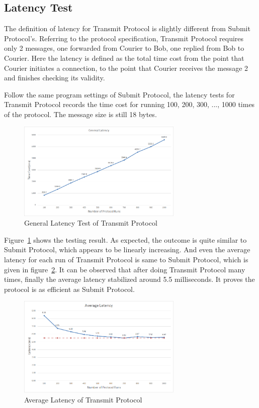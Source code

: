 \subsection{Latency Test}
The definition of latency for Transmit Protocol is slightly different from Submit Protocol's. Referring to the protocol specification, Transmit Protocol requires only 2 messages, one forwarded from Courier to Bob, one replied from Bob to Courier. Here the latency is defined as the total time cost from the point that Courier initiates a connection, to the point that Courier receives the message 2 and finishes checking its validity.

Follow the same program settings of Submit Protocol, the latency tests for Transmit Protocol records the time cost for running 100, 200, 300, ..., 1000 times of the protocol. The message size is still 18 bytes.

\begin{figure}[h!]
\centering
\includegraphics[width=0.7\textwidth,natwidth=882,natheight=529]{figures/latencytransmit.png}
\caption{General Latency Test of Transmit Protocol}
\label{fig:latencytransmit}
\end{figure}

Figure~\ref{fig:latencytransmit} shows the testing result. As expected, the outcome is quite similar to Submit Protocol, which appears to be linearly increasing. And even the average latency for each run of Transmit Protocol is same to Submit Protocol, which is given in figure~\ref{fig:averagelatencytransmit}. It can be observed that after doing Transmit Protocol many times, finally the average latency stabilized around 5.5 milliseconds. It proves the protocol is as efficient as Submit Protocol.

\begin{figure}[h!]
\centering
\includegraphics[width=0.7\textwidth,natwidth=853,natheight=523]{figures/averagelatencytransmit.png}
\caption{Average Latency of Transmit Protocol}
\label{fig:averagelatencytransmit}
\end{figure}


